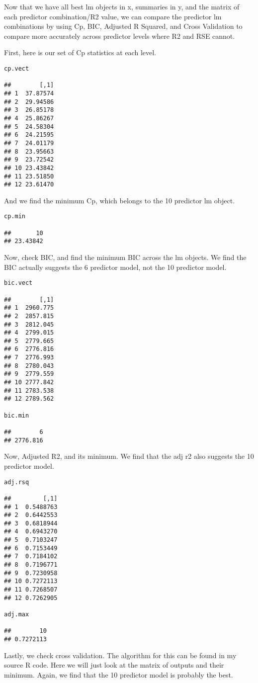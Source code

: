 \documentclass[]{article}
\begin{document}
Now that we have all best lm objects in x, summaries in y, and the
matrix of each predictor combination/R2 value, we can compare the
predictor lm combinations by using Cp, BIC, Adjusted R Squared, and
Cross Validation to compare more accurately across predictor levels
where R2 and RSE cannot.

First, here is our set of Cp statistics at each level.

\begin{verbatim}
cp.vect

##        [,1]
## 1  37.87574
## 2  29.94586
## 3  26.85178
## 4  25.86267
## 5  24.58304
## 6  24.21595
## 7  24.01179
## 8  23.95663
## 9  23.72542
## 10 23.43842
## 11 23.51850
## 12 23.61470
\end{verbatim}

And we find the minimum Cp, which belongs to the 10 predictor lm object.

\begin{verbatim}
cp.min

##       10 
## 23.43842
\end{verbatim}

Now, check BIC, and find the minimum BIC across the lm objects. We find
the BIC actually suggests the 6 predictor model, not the 10 predictor
model.

\begin{verbatim}
bic.vect

##        [,1]
## 1  2960.775
## 2  2857.815
## 3  2812.045
## 4  2799.015
## 5  2779.665
## 6  2776.816
## 7  2776.993
## 8  2780.043
## 9  2779.559
## 10 2777.842
## 11 2783.538
## 12 2789.562

bic.min

##        6 
## 2776.816
\end{verbatim}

Now, Adjusted R2, and its minimum. We find that the adj r2 also suggests
the 10 predictor model.

\begin{verbatim}
adj.rsq

##         [,1]
## 1  0.5488763
## 2  0.6442553
## 3  0.6818944
## 4  0.6943270
## 5  0.7103247
## 6  0.7153449
## 7  0.7184102
## 8  0.7196771
## 9  0.7230958
## 10 0.7272113
## 11 0.7268507
## 12 0.7262905

adj.max

##        10 
## 0.7272113
\end{verbatim}

Lastly, we check cross validation. The algorithm for this can be found
in my source R code. Here we will just look at the matrix of outputs and
their minimum. Again, we find that the 10 predictor model is probably
the best.
\end{document}
